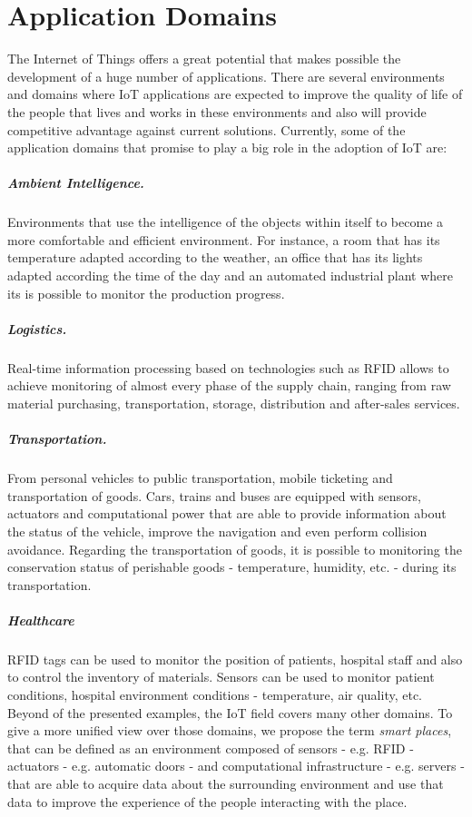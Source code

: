 \section{Application Domains}
\label{sec:application_domains}
The Internet of Things offers a great potential that makes possible the development of a huge number
of applications. There are several environments and domains where \gls{IoT} applications are expected
to improve the quality of life of the people that lives and works in these environments and also
will provide competitive advantage against current solutions. Currently, some of the application
domains that promise to play a big role in the adoption of \gls{IoT} are:

\subparagraph{Ambient Intelligence.} Environments that use the intelligence of the objects within
itself to become a more comfortable and efficient environment. For instance, a room that has its
temperature adapted according to the weather, an office that has its lights adapted according the time
of the day and an automated industrial plant where its is possible to monitor the production progress.
\subparagraph{Logistics.} Real-time information processing based on technologies such as \gls{RFID}
allows to achieve monitoring of almost every phase of the supply chain, ranging from raw material
purchasing, transportation, storage, distribution and after-sales services.
\subparagraph{Transportation.} From personal vehicles to public transportation, mobile ticketing
and transportation of goods. Cars, trains and buses are equipped with sensors, actuators and computational
power that are able to provide information about the status of the vehicle, improve the navigation and
even perform collision avoidance. Regarding the transportation of goods, it is possible to monitoring
the conservation status of perishable goods - temperature, humidity, etc. -  during its transportation.
\subparagraph{Healthcare} \gls{RFID} tags can be used to monitor the position of patients,
hospital staff and also to control the inventory of materials. Sensors can be used to monitor
patient conditions, hospital environment conditions - temperature, air quality, etc.\\

Beyond of the presented examples, the \gls{IoT} field covers many other domains. To give a more unified
view over those domains, we propose the term \textit{smart places}, that can be defined as an environment
composed of sensors - e.g. RFID - actuators - e.g. automatic doors - and computational infrastructure
- e.g. servers - that are able to acquire data about the surrounding environment and use that data to
improve the experience of the people interacting with the place.

